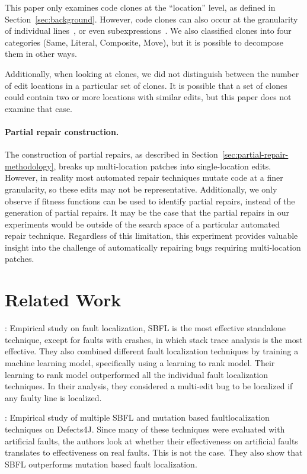 \documentclass[sigconf, timestamp-false, anonymous=true]{acmart}
\begin{document}
This paper only examines code clones at the ``location'' level, as defined in
Section~\ref{sec:background}. However, code clones can also occur at the
granularity of individual lines~\cite{JiaClones}, or even
subexpressions~\cite{microclones}. We also classified clones into four
categories (Same, Literal, Composite, Move), but it is possible to decompose
them in other ways.

Additionally, when looking at clones, we did not distinguish between the number
of edit locations in a particular set of clones. It is possible that a set of
clones could contain two or more locations with similar edits, but this paper
does not examine that case.

\paragraph{Partial repair construction.}
The construction of partial repairs, as described in
Section~\ref{sec:partial-repair-methodology}, breaks up multi-location patches
into single-location edits. However, in
reality most automated repair techniques mutate code at a finer granularity, so
these edits may not be representative.  Additionally, we only observe if fitness
functions can be used to identify partial repairs,
instead of the generation of partial repairs. It may be the case that the
partial repairs in our experiments would be outside of the search space of a
particular automated repair technique.
Regardless of this limitation, this experiment provides valuable 
insight into the challenge of automatically repairing bugs requiring
multi-location patches.

\section{Related Work}

\cite{zou2019empirical}: Empirical study on fault localization, SBFL is the most effective standalone 
technique, except for faults with crashes, in which stack trace analysis is the most effective. They 
also combined different fault localization techniques by training a machine learning model, 
specifically using a learning to rank model. Their learning to rank model outperformed all the 
individual fault localization techniques. In their analysis, they considered a multi-edit bug to be 
localized if any faulty line is localized.

\cite{pearson2017evaluating}: Empirical study of multiple SBFL and mutation based faultlocalization 
techniques on Defects4J. Since many of these techniques were evaluated with artificial faults, the 
authors look at whether their effectiveness on artificial faults translates to effectiveness on real 
faults. This is not the case. They also show that SBFL outperforms mutation based fault localization.
\end{document}
